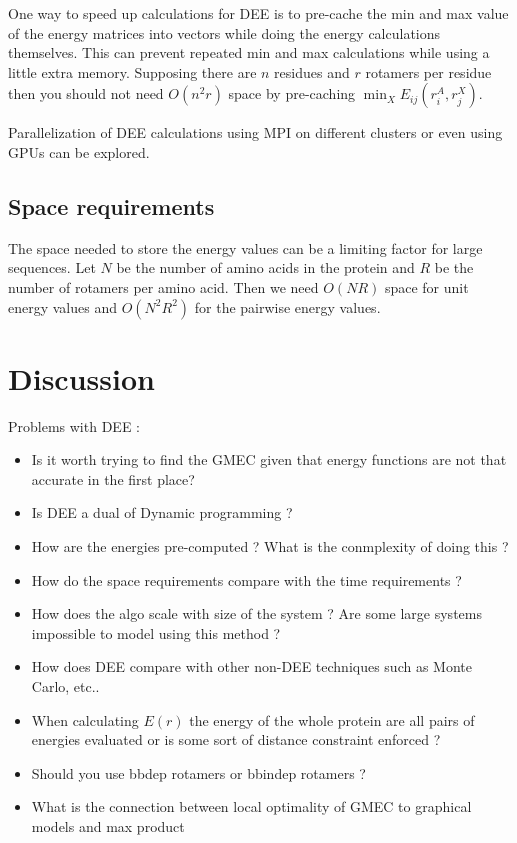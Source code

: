\documentclass{article}
\begin{document}
One way to speed up calculations for DEE is to pre-cache the min and max value of the energy matrices into vectors while doing the energy calculations themselves. This can prevent repeated min and max calculations while using a little extra memory. Supposing there are $n$ residues and $r$ rotamers per residue then you should not need $O(n^2r)$ space by pre-caching $\min_X E_{ij}(r_i^A,r_j^X)$.

Parallelization of DEE calculations using MPI on different clusters or even using GPUs can be explored. 

\subsection{Space requirements}
The space needed to store the energy values can be a limiting factor for large sequences. Let $N$ be the number of amino acids in the protein and $R$ be the number of rotamers per amino acid. Then we need $O(NR)$ space for unit energy values and $O(N^2R^2)$ for the pairwise energy values. 

\section{Discussion}

Problems with DEE :
\begin{itemize}
\item Is it worth trying to find the GMEC given that energy functions are not that accurate in the first place?
\item Is DEE a dual of Dynamic programming ? 
\item How are the energies pre-computed ? What is the conmplexity of doing this ?
\item How do the space requirements compare with the time requirements ?
\item How does the algo scale with size of the system ? Are some large systems impossible to model using this method ? 
\item How does DEE compare with other non-DEE techniques such as Monte Carlo, etc..
\item When calculating $E(r)$ the energy of the whole protein are all pairs of energies evaluated or is some sort of distance constraint enforced ?
\item Should you use bbdep rotamers or bbindep rotamers ?
\item What is the connection between local optimality of GMEC to graphical models and max product
\end{itemize}
\end{document}
